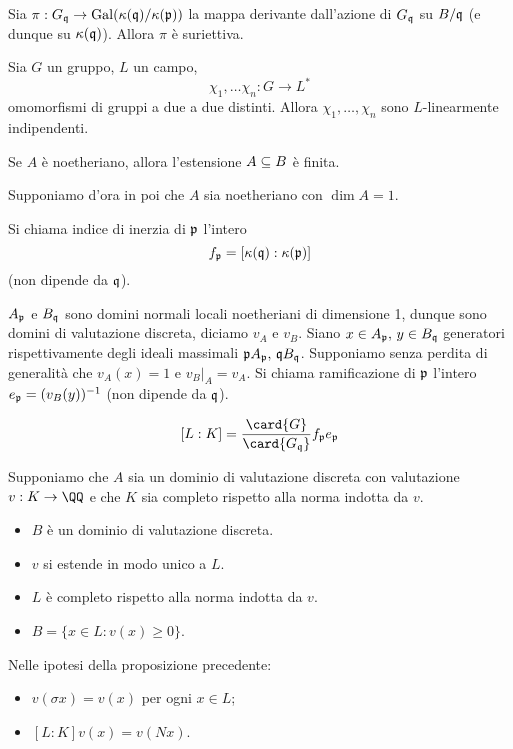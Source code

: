 \begin{proposition}
Sia $\pi:G_{\mathfrak{q}}\rightarrow \operatorname{Gal}(\kappa(\mathfrak{q})/\kappa(\mathfrak{p}))$ la mappa derivante dall'azione di $G_{\mathfrak{q}}$ su $B/\mathfrak{q}$ (e dunque su $\kappa(\mathfrak{q})$). Allora $\pi$ è suriettiva.
\end{proposition}
\begin{lemma}
Sia $G$ un gruppo, $L$ un campo,
$$
\chi_1,\ldots\chi_n:G\longrightarrow L^*
$$
omomorfismi di gruppi a due a due distinti. Allora $\chi_1\comma\ldots\comma\chi_n$ sono $L$-linearmente indipendenti.
\end{lemma}
\begin{proposition}
Se $A$ è noetheriano, allora l'estensione $A\subseteq B$ è finita.
\end{proposition}
\begin{setting}
Supponiamo d'ora in poi che $A$ sia noetheriano con $\dim A=1$.
\end{setting}
\begin{definition}
Si chiama indice di inerzia di $\mathfrak{p}$ l'intero
$$
f_{\mathfrak{p}}=[\kappa(\mathfrak{q}):\kappa(\mathfrak{p})]
$$
(non dipende da $\mathfrak{q}$).
\end{definition}
\begin{definition}
$A_{\mathfrak{p}}$ e $B_{\mathfrak{q}}$ sono domini normali locali noetheriani di dimensione 1, dunque sono domini di valutazione discreta, diciamo $v_A$ e $v_B$. Siano $x\in A_{\mathfrak{p}},\,\allowbreak y\in B_{\mathfrak{q}}$ generatori rispettivamente degli ideali massimali $\mathfrak{p} A_{\mathfrak{p}},\,\allowbreak\mathfrak{q} B_{\mathfrak{q}}$. Supponiamo senza perdita di generalità che $v_A(x)=1$ e $v_B|_A=v_A$. Si chiama ramificazione di $\mathfrak{p}$ l'intero $e_{\mathfrak{p}}=(v_B(y))^{-1}$ (non dipende da $\mathfrak{q}$).
\end{definition}
\begin{proposition}
$$
[L:K]=\frac{\card{G}}{\card{G_\qq}}f_\pp e_\pp
$$
\end{proposition}
\begin{proposition}
Supponiamo che $A$ sia un dominio di valutazione discreta con valutazione $\map{v}{K}{\QQ}$ e che $K$ sia completo rispetto alla norma indotta da $v$.
\begin{itemize}
\item $B$ è un dominio di valutazione discreta.
\item $v$ si estende in modo unico a $L$.
\item $L$ è completo rispetto alla norma indotta da $v$.
\item $B=\{x\in L:v(x)\ge0\}$.
\end{itemize}
\end{proposition}
\begin{corollary}
Nelle ipotesi della proposizione precedente:
\begin{itemize}
\item $v(\sigma x)=v(x)$ per ogni $x\in L$;
\item $[L:K]v(x)=v(Nx)$.
\end{itemize}

\end{corollary}


